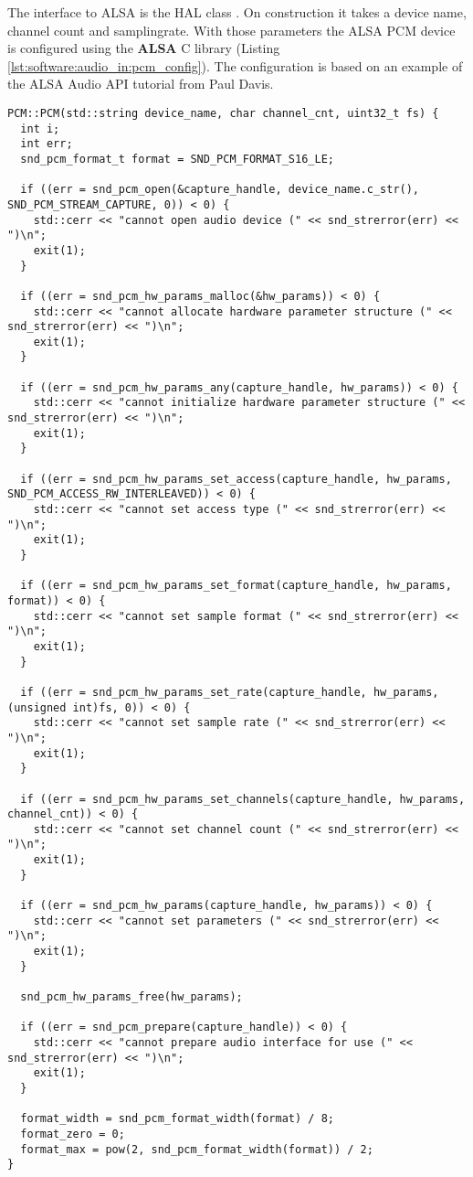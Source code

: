 The interface to ALSA is the HAL class . On construction it takes a device name, channel count and samplingrate. With those parameters the ALSA PCM device is configured using the \textbf{ALSA} C library (Listing \ref{lst:software:audio_in:pcm_config}).\cite{noauthor_alsa_nodate} The configuration is based on an example of the ALSA Audio API tutorial from Paul Davis.\cite{davis_tutorial_nodate}\p
%
\begin{mdframed}
\begin{lstlisting}[caption=ALSA interface configuration, label=lst:software:audio_in:pcm_config]
PCM::PCM(std::string device_name, char channel_cnt, uint32_t fs) {
  int i;
  int err;
  snd_pcm_format_t format = SND_PCM_FORMAT_S16_LE;

  if ((err = snd_pcm_open(&capture_handle, device_name.c_str(), SND_PCM_STREAM_CAPTURE, 0)) < 0) {
    std::cerr << "cannot open audio device (" << snd_strerror(err) << ")\n";
    exit(1);
  }

  if ((err = snd_pcm_hw_params_malloc(&hw_params)) < 0) {
    std::cerr << "cannot allocate hardware parameter structure (" << snd_strerror(err) << ")\n";
    exit(1);
  }

  if ((err = snd_pcm_hw_params_any(capture_handle, hw_params)) < 0) {
    std::cerr << "cannot initialize hardware parameter structure (" << snd_strerror(err) << ")\n";
    exit(1);
  }

  if ((err = snd_pcm_hw_params_set_access(capture_handle, hw_params, SND_PCM_ACCESS_RW_INTERLEAVED)) < 0) {
    std::cerr << "cannot set access type (" << snd_strerror(err) << ")\n";
    exit(1);
  }

  if ((err = snd_pcm_hw_params_set_format(capture_handle, hw_params, format)) < 0) {
    std::cerr << "cannot set sample format (" << snd_strerror(err) << ")\n";
    exit(1);
  }

  if ((err = snd_pcm_hw_params_set_rate(capture_handle, hw_params, (unsigned int)fs, 0)) < 0) {
    std::cerr << "cannot set sample rate (" << snd_strerror(err) << ")\n";
    exit(1);
  }

  if ((err = snd_pcm_hw_params_set_channels(capture_handle, hw_params, channel_cnt)) < 0) {
    std::cerr << "cannot set channel count (" << snd_strerror(err) << ")\n";
    exit(1);
  }

  if ((err = snd_pcm_hw_params(capture_handle, hw_params)) < 0) {
    std::cerr << "cannot set parameters (" << snd_strerror(err) << ")\n";
    exit(1);
  }

  snd_pcm_hw_params_free(hw_params);

  if ((err = snd_pcm_prepare(capture_handle)) < 0) {
    std::cerr << "cannot prepare audio interface for use (" << snd_strerror(err) << ")\n";
    exit(1);
  }

  format_width = snd_pcm_format_width(format) / 8;
  format_zero = 0;
  format_max = pow(2, snd_pcm_format_width(format)) / 2;
}
\end{lstlisting}
\end{mdframed}
